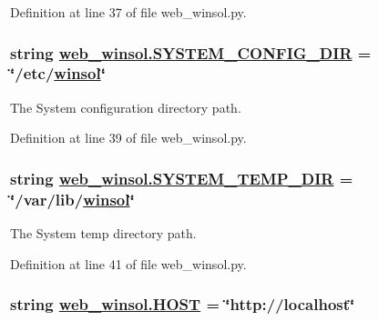 Definition at line 37 of file web\_\-winsol.py.\hypertarget{namespaceweb__winsol_fa7518c129e68076c6b80e16cc1d34d6}{
\subsubsection[SYSTEM\_\-CONFIG\_\-DIR]{\setlength{\rightskip}{0pt plus 5cm}string \hyperlink{namespaceweb__winsol_fa7518c129e68076c6b80e16cc1d34d6}{web\_\-winsol.SYSTEM\_\-CONFIG\_\-DIR} = \char`\"{}/etc/\hyperlink{namespacewinsol_624e4bca2810b741068d3494a5a7612d}{winsol}\char`\"{}}}
\label{namespaceweb__winsol_fa7518c129e68076c6b80e16cc1d34d6}


The System configuration directory path. 



Definition at line 39 of file web\_\-winsol.py.\hypertarget{namespaceweb__winsol_67e3ee663ec1eec231eb892309c5fd07}{
\subsubsection[SYSTEM\_\-TEMP\_\-DIR]{\setlength{\rightskip}{0pt plus 5cm}string \hyperlink{namespaceweb__winsol_67e3ee663ec1eec231eb892309c5fd07}{web\_\-winsol.SYSTEM\_\-TEMP\_\-DIR} = \char`\"{}/var/lib/\hyperlink{namespacewinsol_624e4bca2810b741068d3494a5a7612d}{winsol}\char`\"{}}}
\label{namespaceweb__winsol_67e3ee663ec1eec231eb892309c5fd07}


The System temp directory path. 



Definition at line 41 of file web\_\-winsol.py.\hypertarget{namespaceweb__winsol_c41d276ce6f34b7facca207a47d859bd}{
\subsubsection[HOST]{\setlength{\rightskip}{0pt plus 5cm}string \hyperlink{namespaceweb__winsol_c41d276ce6f34b7facca207a47d859bd}{web\_\-winsol.HOST} = \char`\"{}http://localhost\char`\"{}}}
\label{namespaceweb__winsol_c41d276ce6f34b7facca207a47d859bd}


